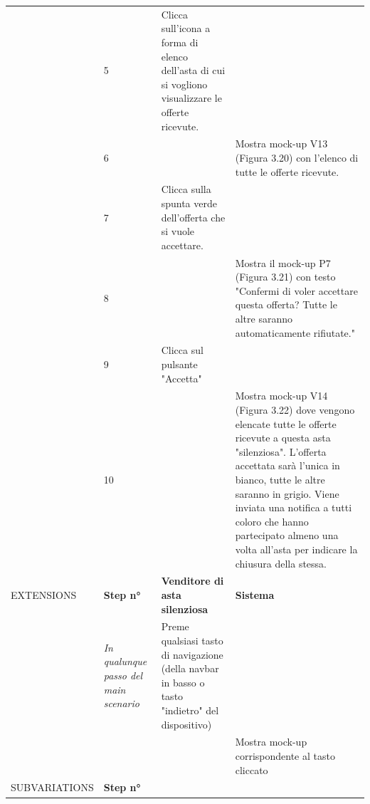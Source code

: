 \begin{longtable}{|C{3.0cm}|C{1.3cm}|L{5.2cm}|L{5.2cm}|}
                        & 5
                        & Clicca sull'icona a forma di elenco dell'asta di cui si vogliono visualizzare le offerte ricevute.
                        & \\
                        & 6
                        & 
                        & Mostra mock-up V13 (Figura 3.20) con l'elenco di tutte le offerte ricevute.\\
                        & 7
                        & Clicca sulla spunta verde dell'offerta che si vuole accettare.
                        & \\
                        & 8
                        & 
                        & Mostra il mock-up P7 (Figura 3.21) con testo "Confermi di voler accettare questa offerta? Tutte le altre saranno automaticamente rifiutate."\\
                        & 9
                        & Clicca sul pulsante "Accetta"
                        & \\
                        & 10
                        & 
                        & Mostra mock-up V14 (Figura 3.22) dove vengono elencate tutte le offerte ricevute a questa asta "silenziosa". L'offerta accettata sarà l'unica in bianco, tutte le altre saranno in grigio. Viene inviata una notifica a tutti coloro che hanno partecipato almeno una volta all'asta per indicare la chiusura della stessa.\\
                \hline
                    EXTENSIONS
                    & \textbf{Step n°} 
                    & \textbf{Venditore di asta silenziosa} 
                    & \textbf{Sistema}\\
                \hline
                        & \textit{In qualunque passo del main scenario}
                        & Preme qualsiasi tasto di navigazione (della navbar in basso o tasto "indietro" del dispositivo)
                        & \\
                        & 
                        & 
                        & Mostra mock-up corrispondente al tasto cliccato\\
                \hline
                    SUBVARIATIONS
                    & \textbf{Step n°} 

\end{longtable}
